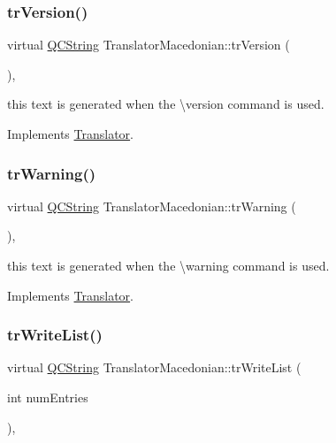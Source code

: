 \subsubsection{\texorpdfstring{trVersion()}{trVersion()}}
{\footnotesize\ttfamily virtual \mbox{\hyperlink{class_q_c_string}{Q\+C\+String}} Translator\+Macedonian\+::tr\+Version (\begin{DoxyParamCaption}{ }\end{DoxyParamCaption})\hspace{0.3cm}{\ttfamily [inline]}, {\ttfamily [virtual]}}

this text is generated when the \textbackslash{}version command is used. 

Implements \mbox{\hyperlink{class_translator}{Translator}}.

\mbox{\label{class_translator_macedonian_a4e10bb366b5ecafdc4fa1d74febb0af0}} 
\subsubsection{\texorpdfstring{trWarning()}{trWarning()}}
{\footnotesize\ttfamily virtual \mbox{\hyperlink{class_q_c_string}{Q\+C\+String}} Translator\+Macedonian\+::tr\+Warning (\begin{DoxyParamCaption}{ }\end{DoxyParamCaption})\hspace{0.3cm}{\ttfamily [inline]}, {\ttfamily [virtual]}}

this text is generated when the \textbackslash{}warning command is used. 

Implements \mbox{\hyperlink{class_translator}{Translator}}.

\mbox{\label{class_translator_macedonian_a9d27fa272baaf9392d5076b3aa04a839}} 
\subsubsection{\texorpdfstring{trWriteList()}{trWriteList()}}
{\footnotesize\ttfamily virtual \mbox{\hyperlink{class_q_c_string}{Q\+C\+String}} Translator\+Macedonian\+::tr\+Write\+List (\begin{DoxyParamCaption}\item[{int}]{num\+Entries }\end{DoxyParamCaption})\hspace{0.3cm}{\ttfamily [inline]}, {\ttfamily [virtual]}}

